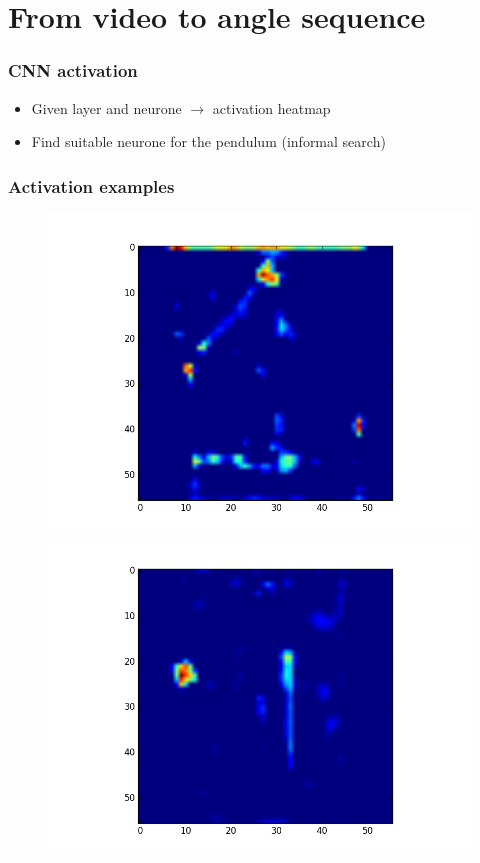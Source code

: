 \documentclass{beamer}
\begin{document}
\section{From video to angle sequence}

\begin{frame}
\frametitle{CNN activation}
\begin{itemize}
	\item Given layer and neurone $\rightarrow$ activation heatmap
	\item Find suitable neurone for the pendulum (informal search)
\end{itemize}
\end{frame}

\begin{frame}
\frametitle{Activation examples}

\begin{figure}
  \includegraphics[width=\linewidth]{activation1.png}
\endminipage\hfill
{}
  \includegraphics[width=\linewidth]{activation2.png}

\end{figure}
\end{frame}
\end{document}
